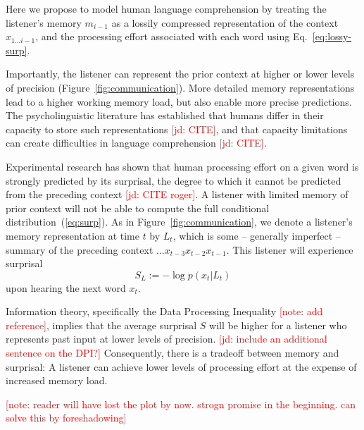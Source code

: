 \documentclass[12pt]{article}
\newcommand{\jd}[1]{\textcolor{Red}{[jd: #1]}}
\newcommand{\note}[1]{\textcolor{Red}{[note: #1]}}
\begin{document}
Here we propose to model human language comprehension by treating the listener's memory $m_{i-1}$ as a lossily compressed representation of the context $x_{1...i-1}$, and the processing effort associated with each word using Eq.~\ref{eq:lossy-surp}. 





Importantly, the listener can represent the prior context at higher or lower levels of precision (Figure~\ref{fig:communication}).
More detailed memory representations lead to a higher working memory load, but also enable more precise predictions.
The psycholinguistic literature has established that humans differ in their capacity to store such representations \jd{CITE}, and that capacity limitations can create difficulties in language comprehension \jd{CITE}.

Experimental research has shown that human processing effort on a given word is strongly predicted by its surprisal, the degree to which it cannot be predicted from the preceding context \jd{CITE roger}.
A listener with limited memory of prior context will not be able to compute the full conditional distribution~(\ref{eq:surp}).
As in Figure~\ref{fig:communication}, we denote a listener's memory representation at time $t$ by $L_t$, which is some -- generally imperfect -- summary of the preceding context $\dots x_{t-3}x_{t-2}x_{t-1}$.
This listener will experience surprisal
\begin{equation}\label{eq:surp-listener}
	S_L :=	-\log p(x_t|L_t)
\end{equation}
upon hearing the next word $x_t$.


Information theory, specifically the Data Processing Inequality \note{add reference}, implies that the average surprisal $S$ will be higher for a listener who represents past input at lower levels of precision. \jd{include an additional sentence on the DPI?}
Consequently, there is a tradeoff between memory and surprisal:
A listener can achieve lower levels of processing effort at the expense of increased memory load.

\note{reader will have lost the plot by now. strogn promise in the beginning. can solve this by foreshadowing}
\end{document}
